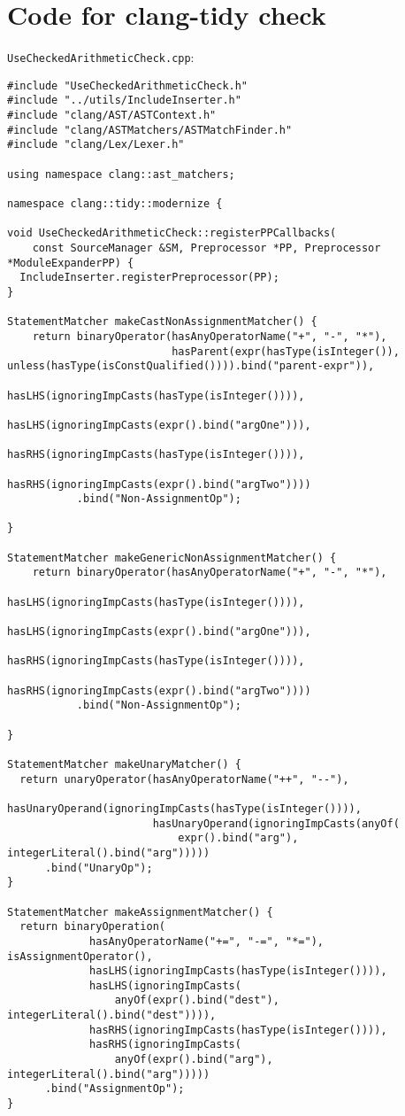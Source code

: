 \chapter{Code for clang-tidy check}
\label{appendix:code}
\texttt{UseCheckedArithmeticCheck.cpp}:
{\scriptsize

\begin{verbatim}
#include "UseCheckedArithmeticCheck.h"
#include "../utils/IncludeInserter.h"
#include "clang/AST/ASTContext.h"
#include "clang/ASTMatchers/ASTMatchFinder.h"
#include "clang/Lex/Lexer.h"

using namespace clang::ast_matchers;

namespace clang::tidy::modernize {

void UseCheckedArithmeticCheck::registerPPCallbacks(
    const SourceManager &SM, Preprocessor *PP, Preprocessor *ModuleExpanderPP) {
  IncludeInserter.registerPreprocessor(PP);
}

StatementMatcher makeCastNonAssignmentMatcher() {
    return binaryOperator(hasAnyOperatorName("+", "-", "*"),
                          hasParent(expr(hasType(isInteger()), unless(hasType(isConstQualified()))).bind("parent-expr")),
                          hasLHS(ignoringImpCasts(hasType(isInteger()))),
                          hasLHS(ignoringImpCasts(expr().bind("argOne"))),
                          hasRHS(ignoringImpCasts(hasType(isInteger()))),
                          hasRHS(ignoringImpCasts(expr().bind("argTwo"))))
           .bind("Non-AssignmentOp");

}

StatementMatcher makeGenericNonAssignmentMatcher() {
    return binaryOperator(hasAnyOperatorName("+", "-", "*"),
                          hasLHS(ignoringImpCasts(hasType(isInteger()))),
                          hasLHS(ignoringImpCasts(expr().bind("argOne"))),
                          hasRHS(ignoringImpCasts(hasType(isInteger()))),
                          hasRHS(ignoringImpCasts(expr().bind("argTwo"))))
           .bind("Non-AssignmentOp");

}

StatementMatcher makeUnaryMatcher() {
  return unaryOperator(hasAnyOperatorName("++", "--"),
                       hasUnaryOperand(ignoringImpCasts(hasType(isInteger()))),
                       hasUnaryOperand(ignoringImpCasts(anyOf(
                           expr().bind("arg"), integerLiteral().bind("arg")))))
      .bind("UnaryOp");
}

StatementMatcher makeAssignmentMatcher() {
  return binaryOperation(
             hasAnyOperatorName("+=", "-=", "*="), isAssignmentOperator(),
             hasLHS(ignoringImpCasts(hasType(isInteger()))),
             hasLHS(ignoringImpCasts(
                 anyOf(expr().bind("dest"), integerLiteral().bind("dest")))),
             hasRHS(ignoringImpCasts(hasType(isInteger()))),
             hasRHS(ignoringImpCasts(
                 anyOf(expr().bind("arg"), integerLiteral().bind("arg")))))
      .bind("AssignmentOp");
}


\end{verbatim}}
